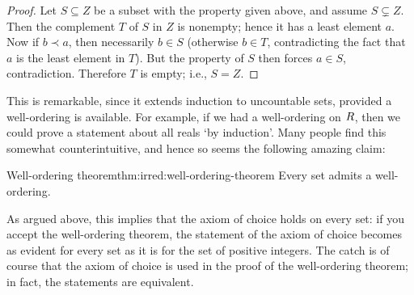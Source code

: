 \begin{proof}
  Let $S \subseteq Z$ be a subset with the property given above, and
  assume $S \subsetneq Z$. Then the complement $T$ of $S$ in $Z$ is
  nonempty; hence it has a least element $a$. Now if $b \prec a$, then
  necessarily $b \in S$ (otherwise $b \in T$, contradicting the fact
  that $a$ is the least element in $T$). But the property of $S$ then
  forces $a \in S$, contradiction. Therefore $T$ is empty; i.e.,
  $S = Z$.
\end{proof}

This is remarkable, since it extends induction to uncountable sets,
provided a well-ordering is available.  For example, if we had a
well-ordering on $R$, then we could prove a statement about all reals
`by induction'. Many people find this somewhat counterintuitive, and
hence so seems the following amazing claim:

\begin{thm}{Well-ordering theorem}{thm:irred:well-ordering-theorem}
  Every set admits a well-ordering.
\end{thm}

As argued above, this implies that the axiom of choice holds on every
set: if you accept the well-ordering theorem, the statement of the
axiom of choice becomes as evident for every set as it is for the set
of positive integers. The catch is of course that the axiom of choice
is used in the proof of the well-ordering theorem; in fact, the
statements are equivalent.

